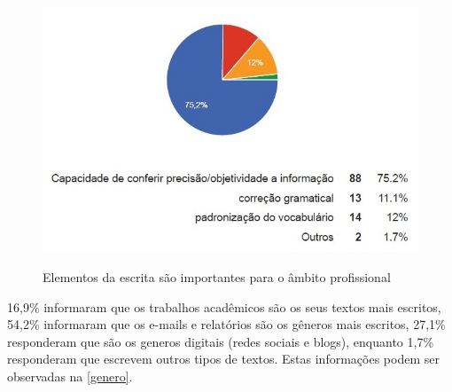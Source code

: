\documentclass[
	article,			%
	11pt,				%
	oneside,			%
	a4paper,			%
	english,			%
	brazil,				%
	sumario=tradicional
	]{abntex2}
\begin{document}
\begin{figure}[h]  
	\begin{center} 
		\begin{center}
			\changecaptionwidth 
			\captionwidth{13.5cm} %
			\caption{\label{elementos} Elementos da escrita são importantes para o âmbito profissional}
			{\includegraphics[scale=0.8]{imagens/elementosescrita}}
		\end{center}
	\end{center}
\end{figure}
\FloatBarrier


16,9\% informaram que os trabalhos acadêmicos são os seus textos mais escritos, 54,2\% informaram que os e-mails e relatórios são os gêneros mais escritos, 27,1\% responderam que são os generos digitais (redes sociais e blogs), enquanto 1,7\% responderam que escrevem outros tipos de textos. Estas informações podem ser observadas na \figurename{ \ref{genero}}.
\end{document}
